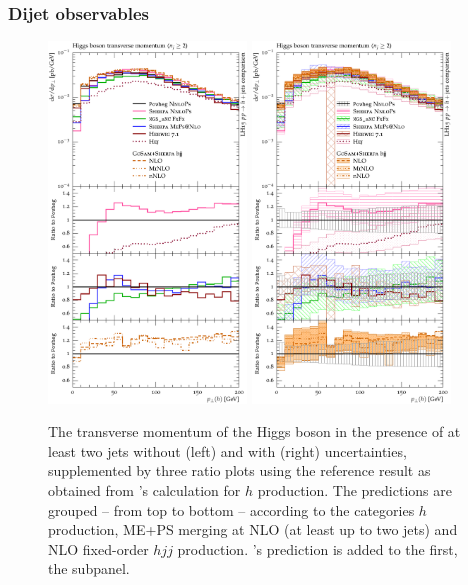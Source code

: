 \subsubsection{Dijet observables}
\label{sec:hjetscomp:results:2jobs}

\begin{figure}[t!]
  \centering
  \includegraphics[width=0.47\textwidth]{figures/hjetscomp_u_H_jj_pT_incl.pdf}
  \hfill
  \includegraphics[width=0.47\textwidth]{figures/hjetscomp_H_jj_pT_incl.pdf}
  \caption{\label{fig:hjetscomp:results:2obs:hpt}%
    The transverse momentum of the Higgs boson in the presence of at
    least two jets without (left) and with (right) uncertainties,
    supplemented by three ratio plots using the reference result as
    obtained from \hjetscompPowheg's \hjetscompNNLOPS calculation for $h$ production.
    The predictions are grouped -- from top to bottom -- according to
    the categories \hjetscompNNLOPS $h$ production, ME+PS merging at NLO (at
    least up to two jets) and NLO fixed-order $hjj$ production. \hjetscompHej's
    prediction is added to the first, the \hjetscompNNLOPS subpanel.}
\end{figure}

